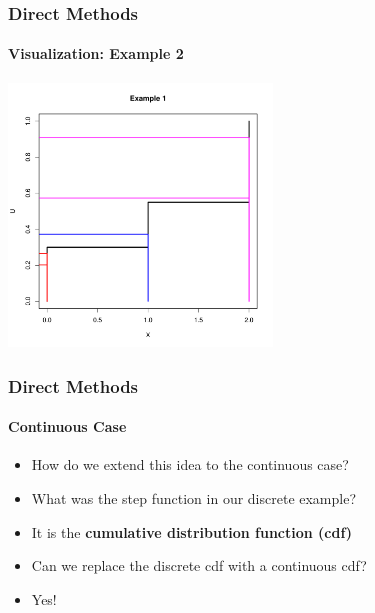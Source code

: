 \documentclass[10pt]{beamer}
\begin{document}
              \begin{frame}
                \frametitle{Direct Methods}
                \framesubtitle{Visualization: Example 2}
                \begin{center}
                  \includegraphics[height=7cm]{./Pics/d2p3.pdf}
                \end{center}
              \end{frame}


              \begin{frame}
                \frametitle{Direct Methods}
                \framesubtitle{Continuous Case}
                \begin{itemize}
                \item How do we extend this idea to the continuous case?

                \item What was the step function in our discrete example?

                \item It is the {\bf cumulative distribution function (cdf)}

                \item Can we replace the discrete cdf with a continuous cdf?

                \item Yes!
                \end{itemize}
              \end{frame}
\end{document}
